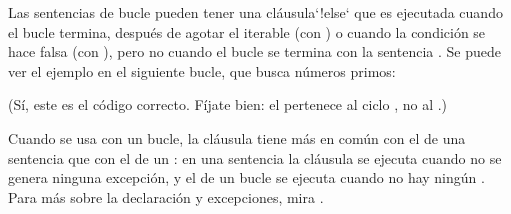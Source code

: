 \documentclass[a4,10pt,spanish]{sphinxmanual}
\begin{document}
\sphinxAtStartPar
Las sentencias de bucle pueden tener una cláusula`!else` que es ejecutada cuando el bucle termina, después de agotar el iterable (con ) o cuando la condición se hace falsa (con ), pero no cuando el bucle se termina con la sentencia . Se puede ver el ejemplo en el siguiente bucle, que busca números primos:

\begin{sphinxVerbatim}[commandchars=\\\{\}]
    
        
             
                
            
    
        
         
\end{sphinxVerbatim}

\sphinxAtStartPar
(Sí, este es el código correcto. Fíjate bien: el  pertenece al ciclo , no al .)

\sphinxAtStartPar
Cuando se usa con un bucle, la cláusula  tiene más en común con el  de una sentencia  que con el de un : en una sentencia  la cláusula  se ejecuta cuando no se genera ninguna excepción, y el  de un bucle se ejecuta cuando no hay ningún . Para más sobre la declaración  y excepciones, mira {\hyperref[\detokenize{tutorial/errors:tut-handling}]{}}.
\end{document}
